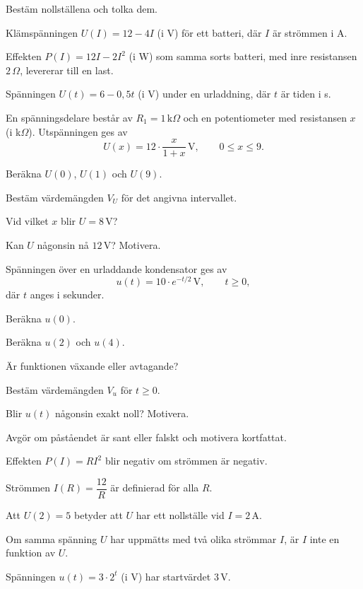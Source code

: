 Bestäm nollställena och tolka dem.
\begin{parts}
  \item Klämspänningen $U(I) = 12 - 4I$ (i V) för ett batteri, där $I$ är strömmen i A.
  \item Effekten $P(I) = 12I - 2I^2$ (i W) som samma sorts batteri, med inre resistansen $2\,\Omega$,
    levererar till en last.
  \item Spänningen $U(t) = 6 - 0{,}5t$ (i V) under en urladdning, där $t$ är tiden i s.
\end{parts}

En spänningsdelare består av $R_1 = 1\,\text{k}\Omega$ och en potentiometer med resistansen $x$
(i k$\Omega$). Utspänningen ges av
\[
  U(x) = 12 \cdot \frac{x}{1 + x}\,\text{V}, \qquad 0 \leq x \leq 9.
\]
\begin{parts}
  \item Beräkna $U(0)$, $U(1)$ och $U(9)$.
  \item Bestäm värdemängden $V_U$ för det angivna intervallet.
  \item Vid vilket $x$ blir $U = 8\,\text{V}$?
  \item Kan $U$ någonsin nå $12\,\text{V}$? Motivera.
\end{parts}

Spänningen över en urladdande kondensator ges av
\[
  u(t) = 10 \cdot e^{-t/2}\,\text{V}, \qquad t \geq 0,
\]
där $t$ anges i sekunder.
\begin{parts}
  \item Beräkna $u(0)$.
  \item Beräkna $u(2)$ och $u(4)$.
  \item Är funktionen växande eller avtagande?
  \item Bestäm värdemängden $V_u$ för $t \geq 0$.
  \item Blir $u(t)$ någonsin exakt noll? Motivera.
\end{parts}

Avgör om påståendet är sant eller falskt och motivera kortfattat.
\begin{parts}
  \item Effekten $P(I) = RI^2$ blir negativ om strömmen är negativ.
  \item Strömmen $I(R) = \dfrac{12}{R}$ är definierad för alla $R$.
  \item Att $U(2) = 5$ betyder att $U$ har ett nollställe vid $I = 2\,\text{A}$.
  \item Om samma spänning $U$ har uppmätts med två olika strömmar $I$, är $I$ inte en funktion av $U$.
  \item Spänningen $u(t) = 3 \cdot 2^t$ (i V) har startvärdet $3\,\text{V}$.
\end{parts}


